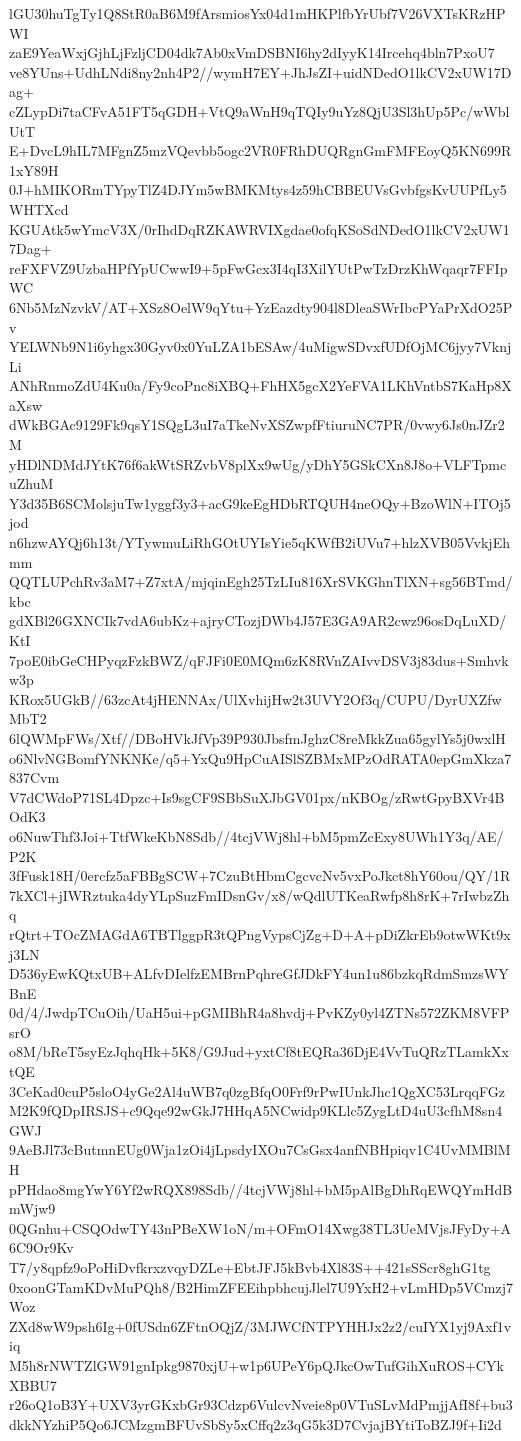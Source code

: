 lGU30huTgTy1Q8StR0aB6M9fArsmiosYx04d1mHKPlfbYrUbf7V26VXTsKRzHPWI
zaE9YeaWxjGjhLjFzljCD04dk7Ab0xVmDSBNI6hy2dIyyK14Ircehq4bln7PxoU7
ve8YUns+UdhLNdi8ny2nh4P2//wymH7EY+JhJsZI+uidNDedO1lkCV2xUW17Dag+
cZLypDi7taCFvA51FT5qGDH+VtQ9aWnH9qTQIy9uYz8QjU3Sl3hUp5Pc/wWblUtT
E+DvcL9hIL7MFgnZ5mzVQevbb5ogc2VR0FRhDUQRgnGmFMFEoyQ5KN699R1xY89H
0J+hMIKORmTYpyTlZ4DJYm5wBMKMtys4z59hCBBEUVsGvbfgsKvUUPfLy5WHTXcd
KGUAtk5wYmcV3X/0rIhdDqRZKAWRVIXgdae0ofqKSoSdNDedO1lkCV2xUW17Dag+
reFXFVZ9UzbaHPfYpUCwwI9+5pFwGcx3I4qI3XilYUtPwTzDrzKhWqaqr7FFIpWC
6Nb5MzNzvkV/AT+XSz8OelW9qYtu+YzEazdty904l8DleaSWrIbcPYaPrXdO25Pv
YELWNb9N1i6yhgx30Gyv0x0YuLZA1bESAw/4uMigwSDvxfUDfOjMC6jyy7VknjLi
ANhRnmoZdU4Ku0a/Fy9coPnc8iXBQ+FhHX5gcX2YeFVA1LKhVntbS7KaHp8XaXsw
dWkBGAc9129Fk9qsY1SQgL3uI7aTkeNvXSZwpfFtiuruNC7PR/0vwy6Js0nJZr2M
yHDlNDMdJYtK76f6akWtSRZvbV8plXx9wUg/yDhY5GSkCXn8J8o+VLFTpmcuZhuM
Y3d35B6SCMolsjuTw1yggf3y3+acG9keEgHDbRTQUH4neOQy+BzoWlN+ITOj5jod
n6hzwAYQj6h13t/YTywmuLiRhGOtUYIsYie5qKWfB2iUVu7+hlzXVB05VvkjEhmm
QQTLUPchRv3aM7+Z7xtA/mjqinEgh25TzLIu816XrSVKGhnTlXN+sg56BTmd/kbc
gdXBl26GXNCIk7vdA6ubKz+ajryCTozjDWb4J57E3GA9AR2cwz96osDqLuXD/KtI
7poE0ibGeCHPyqzFzkBWZ/qFJFi0E0MQm6zK8RVnZAIvvDSV3j83dus+Smhvkw3p
KRox5UGkB//63zcAt4jHENNAx/UlXvhijHw2t3UVY2Of3q/CUPU/DyrUXZfwMbT2
6lQWMpFWs/Xtf//DBoHVkJfVp39P930JbsfmJghzC8reMkkZua65gylYs5j0wxlH
o6NlvNGBomfYNKNKe/q5+YxQu9HpCuAISlSZBMxMPzOdRATA0epGmXkza7837Cvm
V7dCWdoP71SL4Dpzc+Is9sgCF9SBbSuXJbGV01px/nKBOg/zRwtGpyBXVr4BOdK3
o6NuwThf3Joi+TtfWkeKbN8Sdb//4tcjVWj8hl+bM5pmZcExy8UWh1Y3q/AE/P2K
3fFusk18H/0ercfz5aFBBgSCW+7CzuBtHbmCgcvcNv5vxPoJkct8hY60ou/QY/1R
7kXCl+jIWRztuka4dyYLpSuzFmIDsnGv/x8/wQdlUTKeaRwfp8h8rK+7rIwbzZhq
rQtrt+TOcZMAGdA6TBTlggpR3tQPngVypsCjZg+D+A+pDiZkrEb9otwWKt9xj3LN
D536yEwKQtxUB+ALfvDIelfzEMBrnPqhreGfJDkFY4un1u86bzkqRdmSmzsWYBnE
0d/4/JwdpTCuOih/UaH5ui+pGMIBhR4a8hvdj+PvKZy0yl4ZTNs572ZKM8VFPsrO
o8M/bReT5syEzJqhqHk+5K8/G9Jud+yxtCf8tEQRa36DjE4VvTuQRzTLamkXxtQE
3CeKad0cuP5sloO4yGe2Al4uWB7q0zgBfqO0Frf9rPwIUnkJhc1QgXC53LrqqFGz
M2K9fQDpIRSJS+c9Qqe92wGkJ7HHqA5NCwidp9KLlc5ZygLtD4uU3cfhM8sn4GWJ
9AeBJl73cButmnEUg0Wja1zOi4jLpsdyIXOu7CsGsx4anfNBHpiqv1C4UvMMBlMH
pPHdao8mgYwY6Yf2wRQX898Sdb//4tcjVWj8hl+bM5pAlBgDhRqEWQYmHdBmWjw9
0QGnhu+CSQOdwTY43nPBeXW1oN/m+OFmO14Xwg38TL3UeMVjsJFyDy+A6C9Or9Kv
T7/y8qpfz9oPoHiDvfkrxzvqyDZLe+EbtJFJ5kBvb4Xl83S++421sSScr8ghG1tg
0xoonGTamKDvMuPQh8/B2HimZFEEihpbhcujJlel7U9YxH2+vLmHDp5VCmzj7Woz
ZXd8wW9psh6Ig+0fUSdn6ZFtnOQjZ/3MJWCfNTPYHHJx2z2/cuIYX1yj9Axf1viq
M5h8rNWTZlGW91gnIpkg9870xjU+w1p6UPeY6pQJkcOwTufGihXuROS+CYkXBBU7
r26oQ1oB3Y+UXV3yrGKxbGr93Cdzp6VulcvNveie8p0VTuSLvMdPmjjAfI8f+bu3
dkkNYzhiP5Qo6JCMzgmBFUvSbSy5xCffq2z3qG5k3D7CvjajBYtiToBZJ9f+Ii2d
